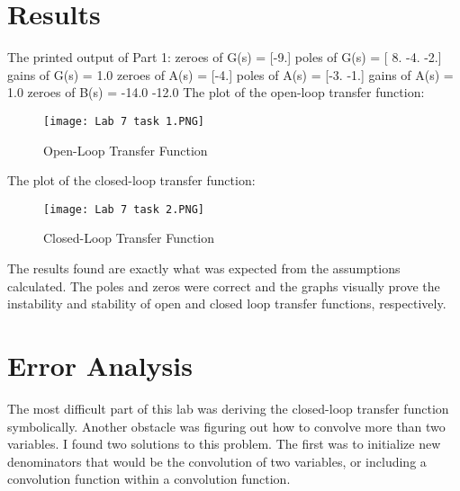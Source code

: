 \documentclass[12pt]{article}
\begin{document}
\section{Results}
The printed output of Part 1:\newline
zeroes of G(s) =  [-9.]\newline
poles of G(s) =  [ 8. -4. -2.]\newline
gains of G(s) =  1.0\newline
zeroes of A(s) =  [-4.]\newline
poles of A(s) =  [-3. -1.]\newline
gains of A(s) =  1.0\newline
zeroes of B(s) =  -14.0 -12.0\newline
The plot of the open-loop transfer function:
\begin{figure}[H]
\texttt{[image: Lab 7 task 1.PNG]}
  \caption{Open-Loop Transfer Function}
  \end{figure}
The plot of the closed-loop transfer function:
\begin{figure}[H]
\texttt{[image: Lab 7 task 2.PNG]} 
  \caption{Closed-Loop Transfer Function}
  \end{figure}
The results found are exactly what was expected from the assumptions calculated. The poles and zeros were correct and the graphs visually prove the instability and stability of open and closed loop transfer functions, respectively.
\section{Error Analysis}
The most difficult part of this lab was deriving the closed-loop transfer function symbolically. Another obstacle was figuring out how to convolve more than two variables. I found two solutions to this problem. The first was to initialize new denominators that would be the convolution of two variables, or including a convolution function within a convolution function.
\end{document}
